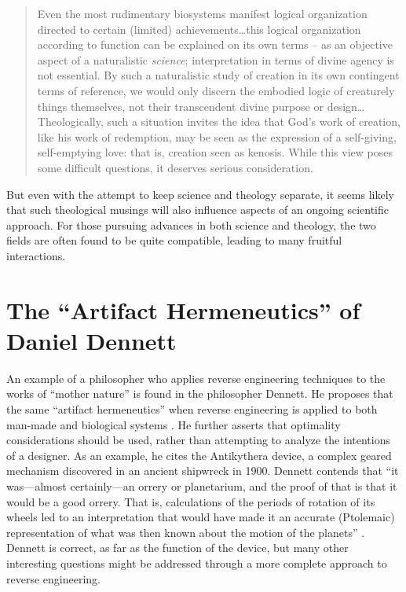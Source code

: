 \begin{quote}
Even the most rudimentary biosystems manifest logical
organization directed to certain (limited) achievements{\ldots}this logical
organization according to function can be explained on its own terms –
as an objective aspect of a naturalistic \textit{science};
interpretation in terms of divine agency is not essential. By such a
naturalistic study of creation in its own contingent terms of
reference, we would only discern the embodied logic of creaturely
things themselves, not their transcendent divine purpose or
design{\ldots}Theologically, such a situation invites the idea that God’s work
of creation, like his work of redemption, may be seen as the expression
of a self-giving, self-emptying love: that is, creation seen as
kenosis. While this view poses some difficult questions, it deserves
serious consideration. \citep[][p.~101]{thorson2003} 
\end{quote}

But even with the attempt
to keep science and theology separate, it seems likely that such
theological musings will also influence aspects of an ongoing
scientific approach. For those pursuing advances in both science and
theology, the two fields are often found to be quite compatible,
leading to many fruitful interactions.

\section[Artifact Hermeneutics]{The “Artifact Hermeneutics” of Daniel Dennett}

An example of a philosopher who applies reverse engineering
techniques to the works of “mother nature” is found in the
philosopher Dennett. He proposes that the same ``artifact hermeneutics''
when reverse engineering is applied to both man-made and biological
systems \citep[][p.~177]{dennett1990}. He further asserts that optimality
considerations should be used, rather than attempting to analyze the
intentions of a designer. As an example, he cites the Antikythera
device, a complex geared mechanism discovered in an ancient shipwreck
in 1900. Dennett contends that “it was---almost certainly---an orrery
or planetarium, and the proof of that is that it would be a good
orrery. That is, calculations of the periods of rotation of its wheels
led to an interpretation that would have made it an accurate
(Ptolemaic) representation of what was then known about the motion of
the planets” \citep[][p.~180]{dennett1990}. Dennett is correct, as far as the
function of the device, but many other interesting questions might be
addressed through a more complete approach to reverse engineering.

